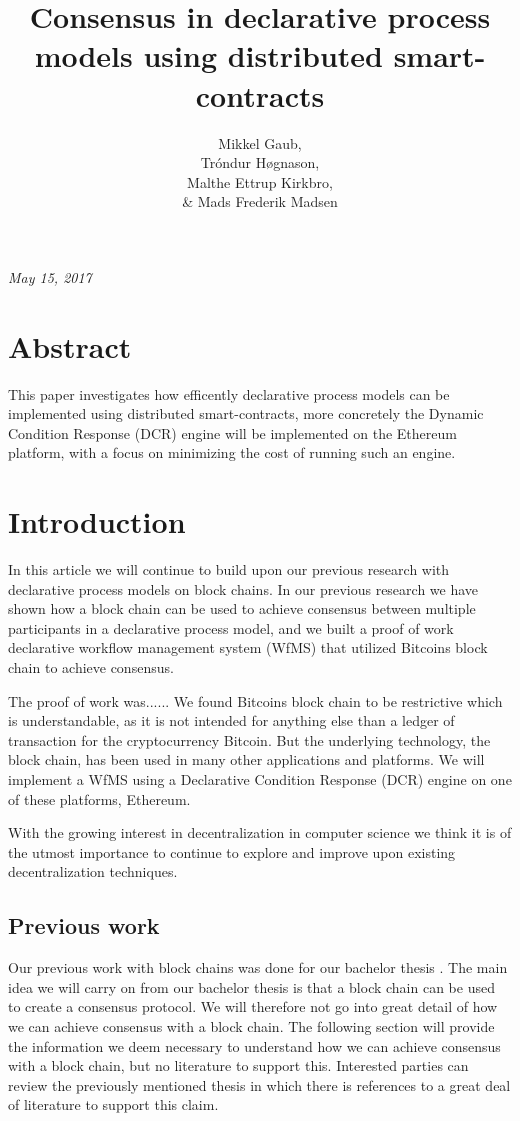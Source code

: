 \documentclass{article}
\title{Consensus in declarative process models using distributed smart-contracts}
\author{Mikkel Gaub, \\ Tróndur Høgnason, \\ Malthe Ettrup Kirkbro, \\ \& Mads Frederik Madsen }
\date{}
\begin{document}
	\begin{titlepage}
		\maketitle		
		\hspace{-18pt}
		\textit{May 15, 2017}
		\vspace{\fill}
		\section*{Abstract}
		This paper investigates how efficently declarative process models can be implemented using distributed smart-contracts, more concretely the Dynamic Condition Response (DCR) engine will be implemented on the Ethereum platform, with a focus on minimizing the cost of running such an engine.
		\thispagestyle{empty}
	\end{titlepage}
	\clearpage

	\setcounter{page}{1}

	\tableofcontents
	\pagebreak

	\section{Introduction}
	In this article we will continue to build upon our previous research with declarative process models on block chains. 
	In our previous research we have shown how a block chain can be used to achieve consensus between multiple participants in a declarative process model, and we built a proof of work declarative workflow management system (WfMS) that utilized Bitcoins block chain to achieve consensus.

	The proof of work was...... 
	We found Bitcoins block chain to be restrictive which is understandable, as it is not intended for anything else than a ledger of transaction for the cryptocurrency Bitcoin. 
	But the underlying technology, the block chain, has been used in many other applications and platforms. 
	We will implement a WfMS using a Declarative Condition Response (DCR) engine on one of these platforms, Ethereum.

	With the growing interest in decentralization in computer science we think it is of the utmost importance to continue to explore and improve upon existing decentralization techniques.

	\subsection{Previous work}
	Our previous work with block chains was done for our bachelor thesis \cite{bachelor}. 
	The main idea we will carry on from our bachelor thesis is that a block chain can be used to create a consensus protocol. 
	We will therefore not go into great detail of how we can achieve consensus with a block chain. 
	The following section will provide the information we deem necessary to understand how we can achieve consensus with a block chain, but no literature to support this. 
	Interested parties can review the previously mentioned thesis in which there is references to a great deal of literature to support this claim.
\end{document}
